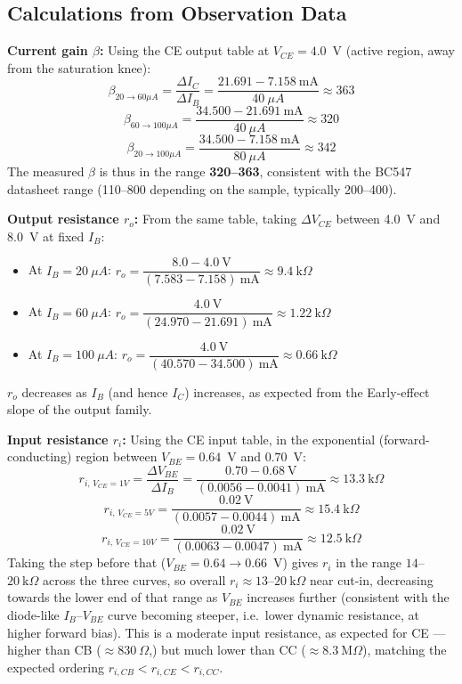 \documentclass[12pt,a4paper]{article}
\begin{document}
\subsection{Calculations from Observation Data}
 
\textbf{Current gain $\beta$:} Using the CE output table at $V_{CE}=4.0$~V (active region, away from the
saturation knee):
\[
\beta_{20\to60\mu A} = \frac{\Delta I_C}{\Delta I_B} = \frac{21.691 - 7.158\ \text{mA}}{40\ \mu A} \approx 363
\]
\[
\beta_{60\to100\mu A} = \frac{34.500 - 21.691\ \text{mA}}{40\ \mu A} \approx 320
\]
\[
\beta_{20\to100\mu A} = \frac{34.500 - 7.158\ \text{mA}}{80\ \mu A} \approx 342
\]
The measured $\beta$ is thus in the range \textbf{320--363}, consistent with the BC547 datasheet range
(110--800 depending on the sample, typically 200--400).
 
\textbf{Output resistance $r_o$:} From the same table, taking $\Delta V_{CE}$ between 4.0~V and 8.0~V at
fixed $I_B$:
\begin{itemize}
    \item At $I_B = 20\ \mu A$: $r_o = \dfrac{8.0-4.0\ \text{V}}{(7.583-7.158)\ \text{mA}} \approx 9.4\ \text{k}\Omega$
    \item At $I_B = 60\ \mu A$: $r_o = \dfrac{4.0\ \text{V}}{(24.970-21.691)\ \text{mA}} \approx 1.22\ \text{k}\Omega$
    \item At $I_B = 100\ \mu A$: $r_o = \dfrac{4.0\ \text{V}}{(40.570-34.500)\ \text{mA}} \approx 0.66\ \text{k}\Omega$
\end{itemize}
$r_o$ decreases as $I_B$ (and hence $I_C$) increases, as expected from the Early-effect slope of the
output family.
 
\textbf{Input resistance $r_i$:} Using the CE input table, in the exponential (forward-conducting)
region between $V_{BE}=0.64$~V and $0.70$~V:
\[
r_{i,\,V_{CE}=1V} = \frac{\Delta V_{BE}}{\Delta I_B} = \frac{0.70-0.68\ \text{V}}{(0.0056-0.0041)\ \text{mA}} \approx 13.3\ \text{k}\Omega
\]
\[
r_{i,\,V_{CE}=5V} = \frac{0.02\ \text{V}}{(0.0057-0.0044)\ \text{mA}} \approx 15.4\ \text{k}\Omega
\]
\[
r_{i,\,V_{CE}=10V} = \frac{0.02\ \text{V}}{(0.0063-0.0047)\ \text{mA}} \approx 12.5\ \text{k}\Omega
\]
Taking the step before that ($V_{BE}=0.64\to0.66$~V) gives $r_i$ in the range $14$--$20\ \text{k}\Omega$
across the three curves, so overall $r_i \approx 13$--$20\ \text{k}\Omega$ near cut-in, decreasing
towards the lower end of that range as $V_{BE}$ increases further (consistent with the diode-like
$I_B$–$V_{BE}$ curve becoming steeper, i.e.\ lower dynamic resistance, at higher forward bias). This is
a moderate input resistance, as expected for CE — higher than CB ($\approx 830\ \Omega$,) but
much lower than CC ($\approx 8.3\ \text{M}\Omega$), matching the expected ordering
$r_{i,CB} < r_{i,CE} < r_{i,CC}$.
\end{document}
